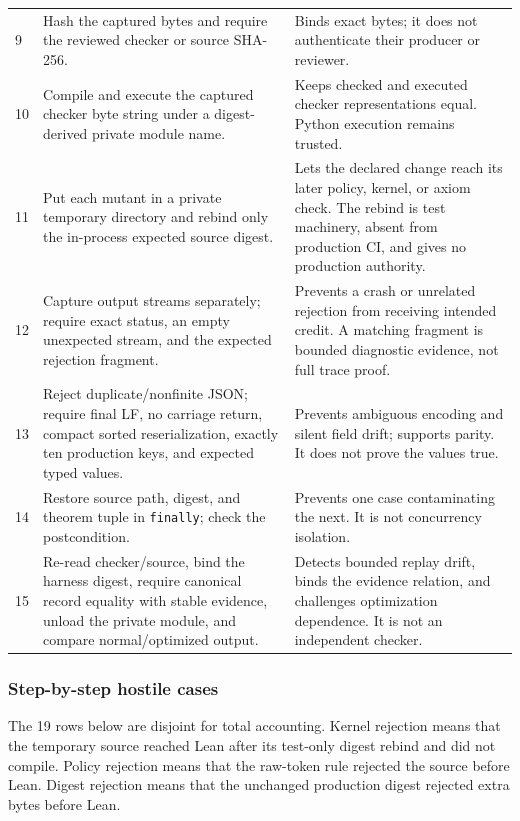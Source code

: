 \documentclass[11pt]{article}
\theoremstyle{definition}
\begin{document}
\begin{longtable}{L{0.055\textwidth}L{0.29\textwidth}L{0.575\textwidth}}
9 & Hash the captured bytes and require the reviewed checker or source SHA-256. & Binds exact bytes;
it does not authenticate their producer or reviewer. \\
10 & Compile and execute the captured checker byte string under a digest-derived private module
name. & Keeps checked and executed checker representations equal.  Python execution remains
trusted. \\
11 & Put each mutant in a private temporary directory and rebind only the in-process expected
source digest. & Lets the declared change reach its later policy, kernel, or axiom check.  The
rebind is test machinery, absent from production CI, and gives no production authority. \\
12 & Capture output streams separately; require exact status, an empty unexpected stream, and the
expected rejection fragment. & Prevents a crash or unrelated rejection from receiving intended
credit.  A matching fragment is bounded diagnostic evidence, not full trace proof. \\
13 & Reject duplicate/nonfinite JSON; require final LF, no carriage return, compact sorted
reserialization, exactly ten production keys, and expected typed values. & Prevents ambiguous
encoding and silent field drift; supports parity.  It does not prove the values true. \\
14 & Restore source path, digest, and theorem tuple in \texttt{finally}; check the postcondition. &
Prevents one case contaminating the next.  It is not concurrency isolation. \\
15 & Re-read checker/source, bind the harness digest, require canonical record equality with stable
evidence, unload the private module, and compare normal/optimized output. & Detects bounded replay
drift, binds the evidence relation, and challenges optimization dependence.  It is not an
independent checker. \\
\bottomrule
\end{longtable}
\endgroup

\subsubsection{Step-by-step hostile cases}

The 19 rows below are disjoint for total accounting.  Kernel rejection means that the temporary
source reached Lean after its test-only digest rebind and did not compile.  Policy rejection means
that the raw-token rule rejected the source before Lean.  Digest rejection means that the unchanged
production digest rejected extra bytes before Lean.
\end{document}
